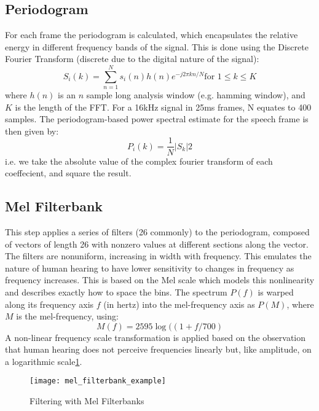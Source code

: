 \subsection{Periodogram}
For each frame the periodogram is calculated, which encapsulates the relative energy in different frequency bands of the signal. This is done using the Discrete Fourier Transform (discrete due to the digital nature of the signal):
\begin{equation}
S_{i}(k) = \sum_{n=1}^{N}  s_{i}(n)h(n)e^{-j2\pi kn/N} \text{for } 1 \leq k \leq K
\end{equation}
where $h(n)$ is an $n$ sample long analysis window (e.g. hamming window), and $K$ is the length of the FFT. For a 16kHz signal in 25ms frames, N equates to 400 samples.
The periodogram-based power spectral estimate for the speech frame  is then given by:
\begin{equation}
P_{i}(k) = \frac{1}{N}|S_{k}|{2}
\end{equation}
i.e. we take the absolute value of the complex fourier transform of each coeffecient, and square the result.

\subsection{Mel Filterbank}
This step applies a series of filters (26 commonly) to the periodogram, composed of vectors of length 26 with nonzero values at different sections along the vector.  The filters are nonuniform, increasing in width with frequency. This emulates the nature of human hearing to have lower sensitivity to changes in frequency as frequency increases. This is based on the Mel scale which models this nonlinearity and describes exactly how to space the bins.
The spectrum $P(f)$ is warped along its frequency axis $f$ (in hertz) into the mel-frequency axis as $P(M)$, where $M$ is the mel-frequency, using:
\begin{equation}
M(f) = 2595 \log((1 + f/700)
\end{equation}
A non-linear frequency scale transformation is applied based on the observation that human hearing does not perceive frequencies linearly but, like amplitude, on a logarithmic scale\ref{filterbank}.
\begin{figure}[h]
	\texttt{[image: mel\_filterbank\_example]}
	\caption{Filtering with Mel Filterbanks \cite{practical_cryptography}}
	\label{filterbank}
\end{figure}


